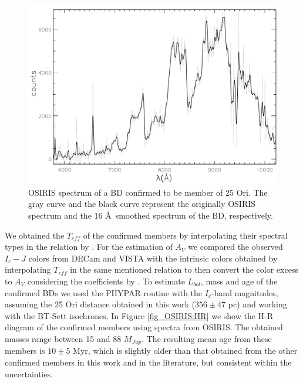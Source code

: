 \documentclass[12pt]{article}
\newcounter{subsubsubsection}[subsubsection]
\begin{document}
\begin{figure}[ht!]
	\includegraphics[width=1.0\textwidth]{member_OSIRIS.pdf}
	\caption[OSIRIS spectrum of a BD confirmed to be member of 25 Ori.]{OSIRIS spectrum of a BD confirmed to be member of 25 Ori. The gray curve and the black curve represent the originally OSIRIS spectrum and the 16 \AA\ smoothed spectrum of the BD, respectively.}
	\label{fig_OSIRIS:spectrum}
\end{figure}

\label{sec_OSIRIS:parameters}
We obtained the $T_{eff}$ of the confirmed members by interpolating their spectral types in the relation by \citet{Pecaut2013}. For the estimation of $A_V$ we compared the observed $I_c-J$ colors from DECam and VISTA with the intrinsic colors obtained by interpolating $T_{eff}$ in the same mentioned relation to then convert the color excess to $A_V$ considering the coefficients by \citet{Cardelli1989}. To estimate $L_{bol}$, mass and age of the confirmed BDs we used the PHYPAR routine with the $I_c$-band magnitudes, assuming the 25 Ori distance obtained in this work ($356\pm47$ pc) and working with the BT-Sett isochrones. In Figure \ref{fig_OSIRIS:HR} we show the H-R diagram of the confirmed members using spectra from OSIRIS. The obtained masses range between 15 and 88 $M_{Jup}$. The resulting mean age from these members is $10\pm5$ Myr, which is slightly older than that obtained from the other confirmed members in this work and in the literature, but consistent within the uncertainties. 
\end{document}
